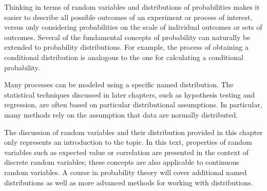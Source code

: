 Thinking in terms of random variables and distributions of probabilities makes it easier to describe all possible outcomes of an experiment or process of interest, versus only considering probabilities on the scale of individual outcomes or sets of outcomes. Several of the fundamental concepts of probability can naturally be extended to probability distributions. For example, the process of obtaining a conditional distribution is analogous to the one for calculating a conditional probability.

Many processes can be modeled using a specific named distribution. The statistical techniques discussed in later chapters, such as hypothesis testing and regression, are often based on particular distributional assumptions. In particular, many methods rely on the assumption that data are normally distributed. 

The discussion of random variables and their distribution provided in this chapter only represents an introduction to the topic. In this text, properties of random variables such as expected value or correlation are presented in the context of discrete random variables; these concepts are also applicable to continuous random variables. A course in probability theory will cover additional named distributions as well as more advanced methods for working with distributions.

